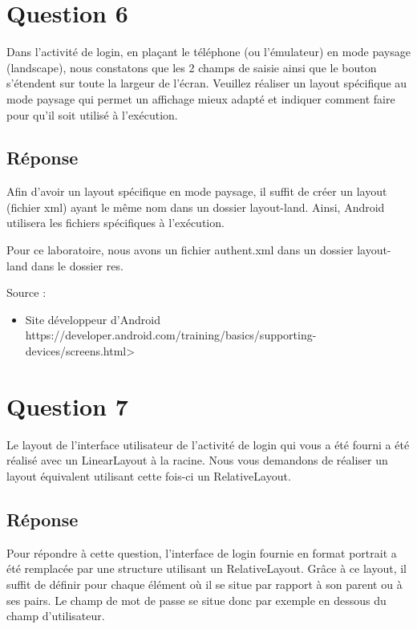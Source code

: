 \documentclass[francais,12pt]{article}
\begin{document}
		
	\section*{Question 6}
		Dans l'activité de login, en plaçant le téléphone (ou l'émulateur) en mode paysage (landscape), nous constatons que les 2 champs de saisie ainsi que le bouton s'étendent sur toute la largeur de l'écran. Veuillez réaliser un layout spécifique au mode paysage qui permet un affichage mieux adapté et indiquer comment faire pour qu’il soit utilisé à l’exécution.  
		
		\subsection*{Réponse}
        Afin d'avoir un layout spécifique en mode paysage, il suffit de créer un layout (fichier xml) ayant le même nom dans un dossier layout-land. Ainsi, Android utilisera les fichiers spécifiques à l'exécution.
        
        Pour ce laboratoire, nous avons un fichier authent.xml dans un dossier layout-land dans le dossier res.
		
		Source :
    	\begin{itemize}
            \item Site développeur d'Android \newline
             https://developer.android.com/training/basics/supporting-devices/screens.html>
        \end{itemize}
		
	\section*{Question 7}
		Le layout de l’interface utilisateur de l’activité de login qui vous a été fourni a été réalisé avec un LinearLayout à la racine. Nous vous demandons de réaliser un layout équivalent utilisant cette fois-ci un RelativeLayout.  
		
		\subsection*{Réponse}
		Pour répondre à cette question, l'interface de login fournie en format portrait a été remplacée par
une structure utilisant un RelativeLayout. Grâce à ce layout, il suffit de définir pour chaque élément où il se situe par rapport à son parent ou à ses pairs. Le champ de mot de passe se situe donc par exemple en dessous du champ d'utilisateur. 
		
\end{document}
